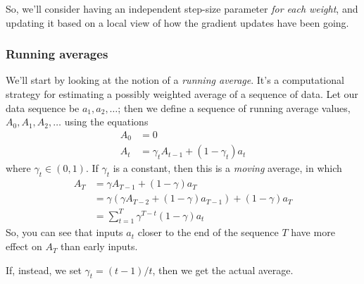 So, we'll consider having an independent step-size parameter {\em for each
    weight}, and updating it based on a local view of how the gradient
updates have been going.

\subsubsection{Running averages}
We'll start by looking at the notion of a {\em running average}.  It's
a computational strategy for estimating a possibly weighted average of
a sequence  of data.  Let our data sequence be $a_1, a_2, \ldots$;
then we define a sequence of running average values, $A_0, A_1, A_2,
  \ldots$ using the equations
\begin{align*}
  A_0 & = 0                                       \\
  A_t & =  \gamma_t A_{t-1} +  (1 - \gamma_t) a_t
\end{align*}
where $\gamma_t \in (0, 1)$.  If $\gamma_t$ is a constant, then this
is a {\em  moving} average, in which
\begin{align*}
  A_T & = \gamma A_{T-1} + (1  - \gamma) a_T                                  \\
      & = \gamma (\gamma A_{T-2} + (1  - \gamma) a_{T-1}) + (1  - \gamma) a_T \\
      & = \sum_{t = 1}^T \gamma^{T-t}(1 - \gamma) a_t
\end{align*}
So, you can see that inputs $a_t$ closer to the end of the sequence $T$
have  more effect on $A_T$ than early inputs.

If, instead, we set $\gamma_t = (t - 1)  / t$, then we get the actual
average.

